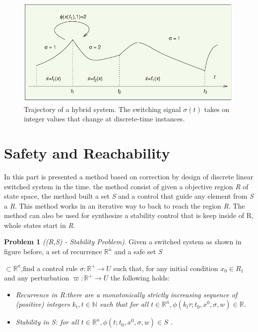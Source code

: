 \begin{figure}[!h]
    \begin{center}
        \includegraphics[width=\textwidth*4/5]{images/swiched}
        \caption{Trajectory of a hybrid system. The switching signal ${\sigma(t)}$ takes on integer values that change at discrete-time instances.\citep{liberzon2003switching}}
    \end{center}
\end{figure}




\section{Safety and Reachability}

In this part is presented a method based on correction by design of discrete linear switched system in the time. the method consist of given a objective region \emph{R} of state space, the method built a set \emph{S} and a control that guide any element from  \emph{S} a \emph{R}. This method works in an iterative way to back to reach the region \emph{R}. The method  can also be used for synthesize a stability control that is keep inside of R, whole states start in \emph{R}. \cite{le2016distributed}


 \textbf{Problem 1} \emph{((R,S) - Stability Problem)}. Given a switched system as shown in figure before, a set of recurrence ${\mathbb{R}^n}$ and a safe set \emph{S}
 
 ${\subset \mathbb{R}^n}$,find a control rule ${\sigma : \mathbb{R}^+ \rightarrow U}$ such that, for any initial condition ${x_0  \in  R_1}$ and any perturbation ${\varpi :\mathbb{R}^+\rightarrow U}$  the following holds:
 
 \begin{itemize}
    \item \emph{ Recurrence in \emph{R}:there are a monotonically strictly increasing sequence of (positive) integers
    ${k_t, t \in \mathbb{N}}$ such that for all ${ t \in \mathbb{R}^n, \phi(k_l\tau;t_0,x^0,\sigma,w) \in \mathbb{R} }$.}

    \item \emph{ Stability in \emph{S}: for all ${ t \in  \mathbb{R}^n, \phi(t;t_0,x^0,\sigma,w) \in S}$ .}
\end{itemize}
 

